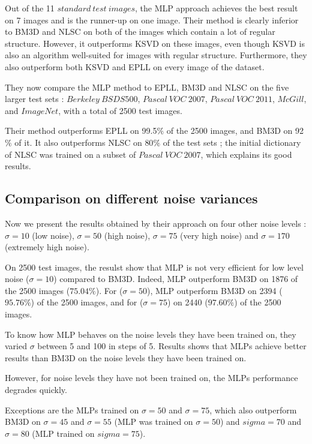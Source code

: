 \documentclass[10pt,a4paper]{article}
\newcommand{\svs}{\vspace{9pt}}
\begin{document}
Out of the 11 $standard\ test\ images$, the MLP approach achieves the best result on 7 images and is the runner-up on one image.
Their method is clearly inferior to BM3D and NLSC on both of the images which contain a lot of regular structure. However, it outperforms KSVD on these images, even though KSVD is also an algorithm well-suited for images with regular structure. Furthermore, they also outperform both KSVD and EPLL on every image of the dataset.

\svs

They now compare the MLP method to EPLL, BM3D and NLSC on the five larger test sets : $Berkeley\ BSDS500$, $Pascal\ VOC\ 2007$, $Pascal\ VOC\ 2011$, $McGill$, and $ImageNet$, with a total of 2500 test images.

\svs

Their method outperforms EPLL on 99.5$\%$ of the 2500 images, and BM3D on 92$\%$ of it. It also outperforms NLSC on 80$\%$ of the test sets ; the initial dictionary of NLSC was trained on a subset of $Pascal\ VOC\ 2007$, which explains its good results.

\subsection{Comparison on different noise variances}

Now we present the results obtained by their approach on four other
noise levels : $\sigma = 10$ (low noise), $\sigma = 50$
(high noise), $\sigma = 75$ (very high noise) and $\sigma = 170$ (extremely high noise). 

\svs

On 2500 test images, the resulst show that MLP is not very efficient for low level noise ($\sigma=10$) compared to BM3D. Indeed, MLP outperform BM3D on 1876 of the 2500 images ($75.04\%$).
For ($\sigma = 50$), MLP outperform BM3D on 2394 ($95.76 \%$) of the 2500 images, and for ($\sigma = 75$) on 2440 ($97.60\%$) of the 2500 images.

\svs 

To know how MLP behaves on the noise levels they have been trained on, they varied $\sigma$ between 5 and 100 in steps of 5.
Results shows that MLPs achieve better results than BM3D on the noise levels they have been trained on.

\svs
However, for noise levels they have not been
trained on, the MLPs performance degrades quickly.

Exceptions are the MLPs trained on $\sigma = 50$ and $\sigma = 75$, which also outperform BM3D on $\sigma = 45$ and $\sigma = 55$ (MLP was trained on $\sigma = 50$) and $sigma = 70$ and $\sigma = 80$ (MLP trained on $sigma = 75$).
\end{document}
